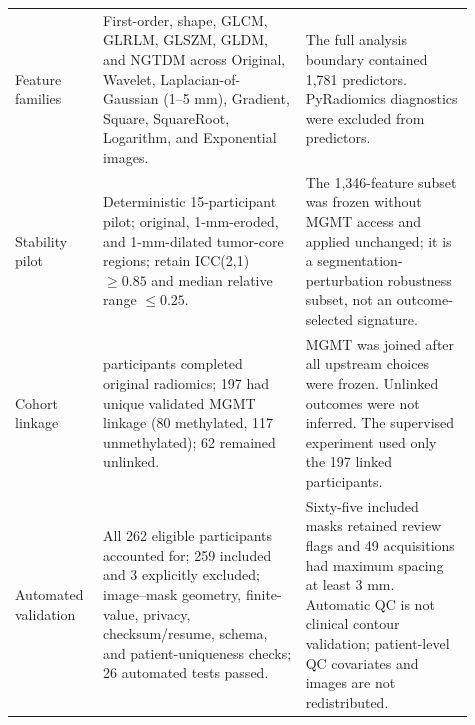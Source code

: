 \begin{longtable}{>{\raggedright\arraybackslash}p{0.16\linewidth}>{\raggedright\arraybackslash}p{0.41\linewidth}>{\raggedright\arraybackslash}p{0.34\linewidth}}
Feature families & First-order, shape, GLCM, GLRLM, GLSZM, GLDM, and NGTDM across Original, Wavelet, Laplacian-of-Gaussian (1--5 mm), Gradient, Square, SquareRoot, Logarithm, and Exponential images. & The full analysis boundary contained 1,781 predictors. PyRadiomics diagnostics were excluded from predictors. \\
Stability pilot & Deterministic 15-participant pilot; original, 1-mm-eroded, and 1-mm-dilated tumor-core regions; retain ICC(2,1) $\geq0.85$ and median relative range $\leq0.25$. & The 1,346-feature subset was frozen without MGMT access and applied unchanged; it is a segmentation-perturbation robustness subset, not an outcome-selected signature. \\
Cohort linkage & 259 participants completed original radiomics; 197 had unique validated MGMT linkage (80 methylated, 117 unmethylated); 62 remained unlinked. & MGMT was joined after all upstream choices were frozen. Unlinked outcomes were not inferred. The supervised experiment used only the 197 linked participants. \\
Automated validation & All 262 eligible participants accounted for; 259 included and 3 explicitly excluded; image--mask geometry, finite-value, privacy, checksum/resume, schema, and patient-uniqueness checks; 26 automated tests passed. & Sixty-five included masks retained review flags and 49 acquisitions had maximum spacing at least 3 mm. Automatic QC is not clinical contour validation; patient-level QC covariates and images are not redistributed. \\
\end{longtable}
\endgroup
